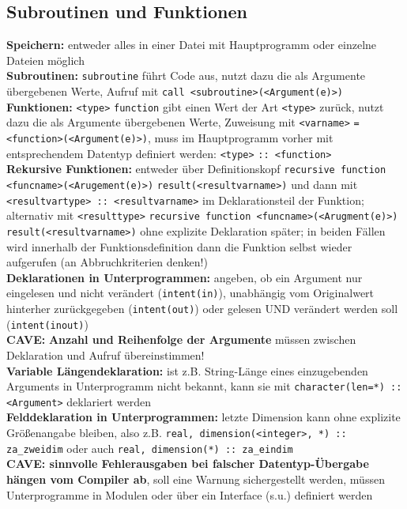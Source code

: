 \documentclass[a4paper, twocolumn]{scrarticle}
\begin{document}
\subsection{Subroutinen und Funktionen}
\textbf{Speichern:} entweder alles in einer Datei mit Hauptprogramm oder einzelne Dateien möglich\\
\textbf{Subroutinen:} \lstinline|subroutine| führt Code aus, nutzt dazu die als Argumente übergebenen Werte, Aufruf mit \lstinline|call <subroutine>(<Argument(e)>)|\\
\textbf{Funktionen:} \lstinline|<type>| \lstinline|function| gibt einen Wert der Art \lstinline|<type>| zurück, nutzt dazu die als Argumente übergebenen Werte, Zuweisung mit \lstinline|<varname>| \lstinline|= <function>(<Argument(e)>)|, muss im Hauptprogramm vorher mit entsprechendem Datentyp definiert werden: \lstinline|<type>| \lstinline|:: <function>|\\
\textbf{Rekursive Funktionen:} entweder über Definitionskopf \lstinline|recursive function <funcname>(<Arugement(e)>)| \lstinline|result(<resultvarname>)| und dann mit \lstinline|<resultvartype> :: <resultvarname>| im Deklarationsteil der Funktion; alternativ mit \lstinline|<resulttype>| \lstinline|recursive function <funcname>(<Arugment(e)>)| \lstinline|result(<resultvarname>)| ohne explizite Deklaration später; in beiden Fällen wird innerhalb der Funktionsdefinition dann die Funktion selbst wieder aufgerufen (an Abbruchkriterien denken!)\\
\textbf{Deklarationen in Unterprogrammen:}  angeben, ob ein Argument nur eingelesen und nicht verändert (\lstinline|intent(in)|), unabhängig vom Originalwert hinterher zurückgegeben (\lstinline|intent(out)|) oder gelesen UND verändert werden soll (\lstinline|intent(inout)|)\\
\textbf{CAVE:} \textbf{Anzahl und Reihenfolge der Argumente} müssen zwischen Deklaration und Aufruf übereinstimmen!\\
\textbf{Variable Längendeklaration:} ist z.B. String-Länge  eines einzugebenden Arguments in Unterprogramm nicht bekannt, kann sie mit \lstinline|character(len=*) :: <Argument>| deklariert werden\\
\textbf{Felddeklaration in Unterprogrammen:} letzte Dimension kann ohne explizite Größenangabe bleiben, also z.B. \lstinline|real, dimension(<integer>, *) :: za_zweidim| oder auch \lstinline|real, dimension(*) :: za_eindim|\\
\textbf{CAVE: sinnvolle Fehlerausgaben bei falscher Datentyp-Übergabe hängen vom Compiler ab}, soll eine Warnung sichergestellt werden, müssen Unterprogramme in Modulen oder über ein Interface (s.u.) definiert werden
\end{document}
